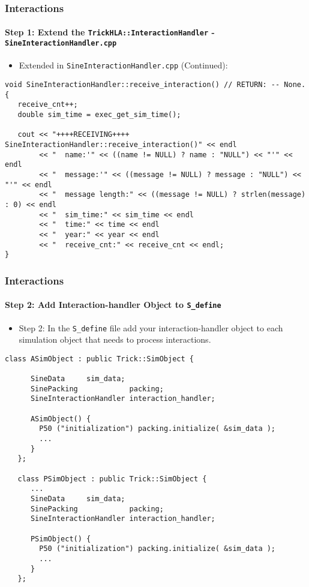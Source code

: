    \begin{frame}[fragile]
      \frametitle{Interactions}
      \framesubtitle{Step 1: Extend the \texttt{TrickHLA::InteractionHandler} - \texttt{SineInteractionHandler.cpp}}
      \begin{itemize}
         \item Extended in \texttt{SineInteractionHandler.cpp} (Continued):
      \end{itemize}
      \vspace{0.2cm}
\begin{Verbatim}[frame=single, fontsize=\tiny]
void SineInteractionHandler::receive_interaction() // RETURN: -- None.
{
   receive_cnt++;
   double sim_time = exec_get_sim_time();

   cout << "++++RECEIVING++++ SineInteractionHandler::receive_interaction()" << endl
        << "  name:'" << ((name != NULL) ? name : "NULL") << "'" << endl
        << "  message:'" << ((message != NULL) ? message : "NULL") << "'" << endl
        << "  message length:" << ((message != NULL) ? strlen(message) : 0) << endl
        << "  sim_time:" << sim_time << endl
        << "  time:" << time << endl
        << "  year:" << year << endl
        << "  receive_cnt:" << receive_cnt << endl;
}
\end{Verbatim}
   \end{frame}

   \begin{frame}[fragile]
      \frametitle{Interactions}
      \framesubtitle{Step 2: Add Interaction-handler Object to \texttt{S\_define}}
      \begin{itemize}
         \item Step 2: In the \texttt{S\_define} file add your interaction-handler
         object to each simulation object that needs to process interactions.  
      \end{itemize}
\begin{Verbatim}[frame=single, fontsize=\tiny]
   class ASimObject : public Trick::SimObject {

      SineData     sim_data;
      SinePacking            packing;
      SineInteractionHandler interaction_handler;

      ASimObject() {
        P50 ("initialization") packing.initialize( &sim_data );
        ...
      }
   };

   class PSimObject : public Trick::SimObject {
      ...
      SineData     sim_data;
      SinePacking            packing;
      SineInteractionHandler interaction_handler;

      PSimObject() {
        P50 ("initialization") packing.initialize( &sim_data );
        ...
      }
   };
\end{Verbatim}
   \end{frame}

